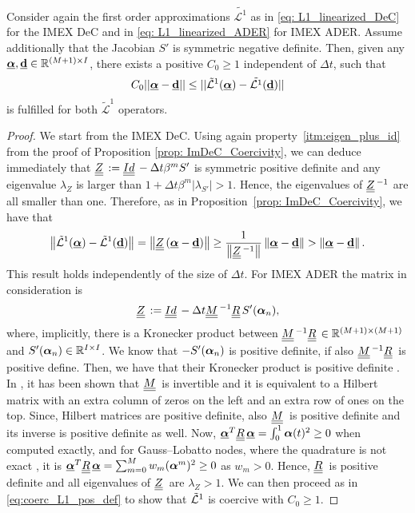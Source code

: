 \begin{prop}
	Consider again the first order approximations $\tilde{\mathcal{L}^1}$ as in \eqref{eq: L1_linearized_DeC} for the IMEX DeC and in \eqref{eq: L1_linearized_ADER} for IMEX ADER. 
	Assume additionally that the Jacobian $S'$ is symmetric negative definite.
	Then, given any $\underline{\boldsymbol{\alpha}}, \underline{\mathbf{d}} \in \mathbb{R}^{(M+1)\times I}$, there exists a positive $C_0\geq 1$ independent of $\Delta t$, such that
	\begin{equation*}
	C_0||\underline{\boldsymbol{\alpha}}-\underline{\mathbf{d}}||\leq ||\tilde{\mathcal{L}}^1 (\underline{\boldsymbol{\alpha}})-\tilde{\mathcal{L}^1} (\underline{\mathbf{d}})||
	\end{equation*}
	is fulfilled for both $\tilde{\mathcal{L}}^1$ operators.
\end{prop}
\begin{proof}
	We start from the IMEX DeC. Using again property~\ref{itm:eigen_plus_id} from the proof of Proposition \ref{prop: ImDeC_Coercivity}, we can deduce immediately that $\mat{Z}:=\mat{Id}-\Delta t \beta^m S'$ is symmetric positive definite and any eigenvalue $\lambda_{Z}$ is larger than $1+ \Delta t \beta^m |\lambda_{S'}|>1$. Hence, the eigenvalues of $\mat{Z}^{-1}$ are all smaller than one. 
	Therefore, as in Proposition~\ref{prop: ImDeC_Coercivity}, we have that 
	\begin{equation}\label{eq:coerc_L1_pos_def}
		\norm{\tilde{\L}^1(\bbc)-\tilde{\L}^1(\bbd)} = \norm{\mat{Z}(\bbc - \bbd) } \geq \frac{1}{\norm{\mat{Z}^{-1}}}\norm{\bbc-\bbd} > \norm{\bbc-\bbd}. 
	\end{equation}
	This result holds independently of the size of $\Delta t$.	
	For IMEX ADER the matrix in consideration is $$\mat{Z}:= \mat{Id}-\Delta t \mat{M}^{-1}\mat{R} S'(\bc_n),$$
	where, implicitly, there is a Kronecker product between $\mat{M}^{-1}\mat{R}\in \mathbb R^{(M+1)\times (M+1)}$ and $S'(\boldsymbol{\alpha}_n)\in\mathbb R^{I\times I}$. We know that $-S'(\boldsymbol{\alpha}_n)$ is positive definite, if also $\mat{M}^{-1}\mat{R}$ is positive define. Then, we have that their Kronecker product is positive definite \cite[Section 1]{vanloan1993approximation}. In \cite{veiga2023improving}, it has been shown that $\mat{M}$ is invertible and it is equivalent to a Hilbert matrix with an extra column of zeros on the left and an extra row of ones on the top.  
	Since, Hilbert matrices are positive definite, also $\mat{M}$ is positive definite and its inverse is positive definite as well.
	Now, $\bbc^T\mat{R}\bbc = \int_{0}^{1} \bc(t)^2 \geq 0$ when computed exactly, and for Gauss--Lobatto nodes, where the quadrature is not exact \cite{veiga2023improving}, it is $\bbc^T\mat{R}\bbc = \sum_{m=0}^M w_m (\bc^{m})^2 \geq 0$ as $w_m>0$. Hence,  $\mat{R}$ is positive definite and all eigenvalues of $\mat{Z}$ are $\lambda_Z>1$. We can then proceed as in \eqref{eq:coerc_L1_pos_def} to show that $\tilde{\mathcal L}^1$ is coercive with $C_0\geq 1$.
\end{proof}
